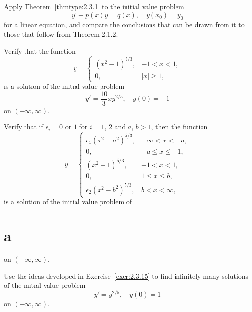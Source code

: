 \begin{exerciselist}
  \item\label{exer:2.3.14} Apply Theorem~\ref{thmtype:2.3.1} to the initial value problem
  \[
    y'+p(x)y=q(x),\quad y(x_{0})=y_{0}
  \]
  for a linear equation, and compare the conclusions that can be drawn from it to those that follow
  from Theorem 2.1.2.

  \item\label{exer:2.3.15}
  \begin{alist}
    \item %
    Verify that the function
    \[
      y=\left\{
      \begin{array}{cl}
        (x^{2}-1)^{5/3}, & -1<x<1,  \\[6pt]
        0,               & |x|\ge1,
      \end{array}\right.
    \]
    is a solution of the initial value problem
    \[
      y'=\frac{10}{3}xy^{2/5},\quad y(0)=-1
    \]
    on $(-\infty,\infty)$. 

    \item %
    Verify that if $\epsilon_{i}=0$ or $1$ for $i=1$, $2$ and $a$, $b>1$, then the function
    \[
      y=\left\{
      \begin{array}{cl}
        \epsilon_{1}(x^{2}-a^{2})^{5/3}, & -\infty<x<-a, \\[6pt]
        0,                               & -a\le x\le-1, \\[6pt]
        (x^{2}-1)^{5/3},                 & -1<x<1,       \\[6pt]
        0,                               & 1\le x\le b,  \\[6pt]
        \epsilon_{2}(x^{2}-b^{2})^{5/3}, & b<x<\infty,
      \end{array}\right.
    \]
    is a solution of the initial value problem of \part{a} on $(-\infty,\infty)$.
  \end{alist}

  \item\label{exer:2.3.16} Use the ideas developed in Exercise~\ref{exer:2.3.15} to find infinitely
        many solutions of the initial value problem
  \[
    y'=y^{2/5},\quad y(0)=1
  \]
  on $(-\infty,\infty)$.


\end{exerciselist}
